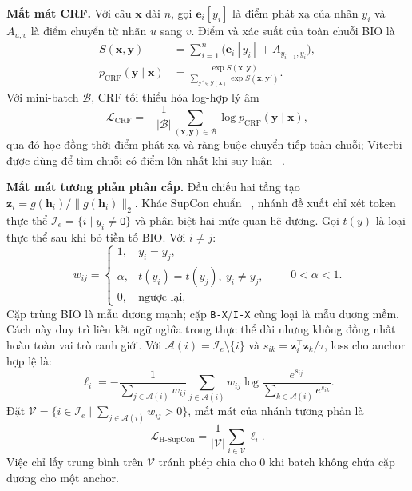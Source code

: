 \documentclass[conference,a4paper]{IEEEtran}
\begin{document}
\noindent\textbf{Mất mát CRF.} Với câu $\mathbf x$ dài $n$, gọi
$\mathbf e_i[y_i]$ là điểm phát xạ của nhãn $y_i$ và $A_{u,v}$ là điểm
chuyển từ nhãn $u$ sang $v$. Điểm và xác suất của toàn chuỗi BIO là
\begin{equation}
\begin{aligned}
S(\mathbf x,\mathbf y)
 &=\sum_{i=1}^{n}\bigl(\mathbf e_i[y_i]+A_{y_{i-1},y_i}\bigr),\\
p_{\mathrm{CRF}}(\mathbf y\mid\mathbf x)
 &=\frac{\exp S(\mathbf x,\mathbf y)}
 {\sum_{\mathbf y'\in\mathcal Y(\mathbf x)}\exp S(\mathbf x,\mathbf y')}.
\end{aligned}
\label{eq:crf-probability}
\end{equation}
Với mini-batch $\mathcal B$, CRF tối thiểu hóa log-hợp lý âm
\begin{equation}
\mathcal L_{\mathrm{CRF}}
=-\frac{1}{|\mathcal B|}\sum_{(\mathbf x,\mathbf y)\in\mathcal B}
\log p_{\mathrm{CRF}}(\mathbf y\mid\mathbf x),
\label{eq:crf-loss}
\end{equation}
qua đó học đồng thời điểm phát xạ và ràng buộc chuyển tiếp toàn chuỗi;
Viterbi được dùng để tìm chuỗi có điểm lớn nhất khi suy luận
~\cite{lafferty2001crf}.

\noindent\textbf{Mất mát tương phản phân cấp.} Đầu chiếu hai tầng tạo
$\mathbf z_i=g(\mathbf h_i)/\|g(\mathbf h_i)\|_2$. Khác SupCon chuẩn
~\cite{khosla2020supcon}, nhánh đề xuất chỉ xét token thực thể
$\mathcal I_e=\{i\mid y_i\ne\texttt{O}\}$ và phân biệt hai mức quan hệ
dương. Gọi $t(y)$ là loại thực thể sau khi bỏ tiền tố BIO. Với $i\ne j$:
\begin{equation}
w_{ij}=\begin{cases}
1, & y_i=y_j,\\
\alpha, & t(y_i)=t(y_j),\ y_i\ne y_j,\\
0, & \text{ngược lại},
\end{cases}\qquad 0<\alpha<1.
\label{eq:weights}
\end{equation}
Cặp trùng BIO là mẫu dương mạnh; cặp \texttt{B-X}/\texttt{I-X} cùng
loại là mẫu dương mềm. Cách này duy trì liên kết ngữ nghĩa trong thực
thể dài nhưng không đồng nhất hoàn toàn vai trò ranh giới. Với
$\mathcal A(i)=\mathcal I_e\setminus\{i\}$ và
$s_{ik}=\mathbf z_i^\top\mathbf z_k/\tau$, loss cho anchor hợp lệ là:
\begin{equation}
\ell_i=-\frac{1}{\sum_{j\in\mathcal A(i)}w_{ij}}
\sum_{j\in\mathcal A(i)}w_{ij}
\log\frac{e^{s_{ij}}}{\sum_{k\in\mathcal A(i)}e^{s_{ik}}}.
\label{eq:hsupcon-anchor}
\end{equation}
Đặt $\mathcal V=\{i\in\mathcal I_e\mid
\sum_{j\in\mathcal A(i)}w_{ij}>0\}$, mất mát của nhánh tương phản là
\begin{equation}
\mathcal L_{\mathrm{H\text{-}SupCon}}
=\frac{1}{|\mathcal V|}\sum_{i\in\mathcal V}\ell_i.
\label{eq:hsupcon-loss}
\end{equation}
Việc chỉ lấy trung bình trên $\mathcal V$ tránh phép chia cho 0 khi batch
không chứa cặp dương cho một anchor.
\end{document}
